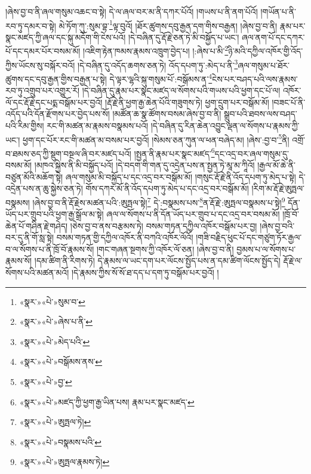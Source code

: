 །ཞེས་བྱ་བ་ནི་ཞལ་གསུམ་འཆང་བ་སྟེ། དེ་ལ་ཞལ་བར་མ་ནི་དཀར་པོའོ། །གཡས་པ་ནི་ནག་པོའོ། །གཡོན་པ་ནི་རབ་ཏུ་དམར་བ་སྟེ། མེ་ཏོག་ཀུ་:སུམ་བྷ་\footnote{«སྣར་»«པེ་»སུམ་བ་}ལྟ་བུའོ། །ཐོར་ཚུགས་དབུ་རྒྱན་དག་གིས་བརྒྱན། །ཞེས་བྱ་བ་ནི། རྣམ་པར་སྣང་མཛད་ཀྱི་ཞལ་དང་སྐུ་མདོག་གི་ངེས་པའོ། །དེ་བཞིན་དུ་རྡོ་རྗེ་ཅན་ཏེ་མི་བསྐྱོད་པ་ཡང་། ཞལ་ནག་པོ་དང་དཀར་པོ་དང་དམར་པོར་བསམ་མོ། །འཇིག་རྟེན་ཁམས་རྣམས་འཁྲུག་བྱེད་པ། །:ཞེས་པ་མི་\footnote{«སྣར་»«པེ་»ཞེས་པ་ནི་}ཉི་མའི་དཀྱིལ་འཁོར་གྱི་འོད་ཀྱིས་ཡོངས་སུ་བསྐོར་བའོ། །དེ་བཞིན་དུ་འདོད་ཆགས་ཅན་ཏེ། འོད་དཔག་ཏུ་:མེད་པ་ནི་\footnote{«སྣར་»«པེ་»མེད་པའི་}ཞལ་གསུམ་པ་ཐོར་ཚུགས་དང་དབུ་རྒྱན་གྱིས་བརྒྱན་པ་སྟེ། དེ་ལྟར་ལྷའི་སྐུ་གསུམ་པོ་:བསྒོམས་ན་\footnote{«སྣར་»«པེ་»བསྒོམས་ནས་}ངེས་པར་བཤད་པའི་ལས་རྣམས་རབ་ཏུ་འགྲུབ་པར་འགྱུར་རོ། །དེ་བཞིན་དུ་རྣམ་པར་སྣང་མཛད་ལ་སོགས་པའི་གཡས་པའི་ཕྱག་དང་པོ་ལ། འཁོར་ལོ་དང་རྡོ་རྗེ་དང་པདྨ་བསྒོམ་པར་བྱའོ། །རྡོ་རྗེ་ནི་ཕྱག་རྒྱ་ཆེན་པོའི་གཟུགས་ཏེ། ཕྱག་དྲུག་པར་བསྒོམ་མོ། །བཟང་པོ་ནི་འདོད་པའི་དོན་རྫོགས་པར་བྱེད་པས་སོ། །མཚོན་ཆ་སྣ་ཚོགས་བསམ་ཞེས་བྱ་བ་ནི། སྒྲུབ་པའི་ཐབས་ལས་བཤད་པའི་རིམ་གྱིས། རང་གི་མཚན་མ་རྣམས་བསྣམས་པའོ། །དེ་བཞིན་དུ་རིན་ཆེན་འབྱུང་ལྡན་ལ་སོགས་པ་རྣམས་ཀྱི་ཡང་། ཕྱག་དང་པོར་རང་གི་མཚན་མ་བསམ་པར་བྱའོ། །སེམས་ཅན་ཀུན་ལ་ཕན་བཞེད་མ། །ཞེས་:བྱ་བ་\footnote{«སྣར་»«པེ་»བྱ་}ནི། འགྲོ་བ་ཐམས་ཅད་ཀྱི་སྡུག་བསྔལ་ཞི་བར་མཛད་པའོ། །སྤྱན་ནི་རྣམ་པར་སྣང་མཛད་\footnote{«སྣར་»«པེ་»མཛད་ཀྱི་ཕྱག་རྒྱ་ཡིན་པས། རྣམ་པར་སྣང་མཛད་}དང་འདྲ་བར་ཞལ་གསུམ་དུ་བསམ་མོ། །མཁའ་སྐྱེས་ནི་མི་བསྐྱོད་པའོ། །དེ་བདག་གི་གན་དུ་འདྲེན་པས་ན་སྤྱན་ཏེ་མཱ་མ་ཀཱིའོ། །རྒྱལ་མོ་ཆེ་ནི་བཙུན་མོའི་མཆོག་སྟེ། ཞལ་གསུམ་མི་བསྐྱོད་པ་དང་འདྲ་བར་བསྒོམ་མོ། །གསུང་རྡོ་རྗེ་ནི་འོད་དཔག་ཏུ་མེད་པ་སྟེ། དེ་འདྲེན་པས་ན་ཆུ་སྐྱེས་ཅན་ཏེ། གོས་དཀར་མོ་ནི་འོད་དཔག་ཏུ་མེད་པ་དང་འདྲ་བར་བསྒོམ་མོ། །རིག་མ་རྡོ་རྗེ་ཨུཏྤལ་བསྣམས། །ཞེས་བྱ་བ་ནི་རྡོ་རྗེས་མཚན་པའི་:ཨུཏྤལ་སྟེ།\footnote{«སྣར་»«པེ་»ཨུཏྤལ་ཏེ།} དེ་:བསྣམས་པས་\footnote{«སྣར་»«པེ་»བསྣམས་པའི་}ན་རྡོ་རྗེ་:ཨུཏྤལ་བསྣམས་པ་སྟེ།\footnote{«སྣར་»«པེ་»ཨུཏྤལ་རྣམས་ཏེ།} དོན་ཡོད་པར་གྲུབ་པའི་ཕྱག་རྒྱ་སྒྲོལ་མ་སྟེ། ཞལ་ལ་སོགས་པ་ནི་དོན་ཡོད་པར་གྲུབ་པ་དང་འདྲ་བར་བསམ་མོ། །ཁྲོ་བོ་ཆེན་པོ་གཤིན་རྗེ་གཤེད། །ཅེས་བྱ་བ་ནས་བརྩམས་ཏེ། བསམ་གཏན་དཀྱིལ་འཁོར་བསྒོམ་པར་བྱ། །ཞེས་བྱ་བའི་བར་དུ་ནི་གོ་སླ་སྟེ། བསམ་གཏན་གྱི་དཀྱིལ་འཁོར་ནི་བཀའི་འཁོར་ལོའོ། །གཟི་བརྗིད་ཕུང་པོ་དང་གཙུག་ཏོར་རྒྱལ་བ་ལ་སོགས་པ་ནི་ཁྲོ་བོ་རྣམས་སོ། །གང་གཞན་སྔགས་ཀྱི་འཁོར་ལོ་ཅན། །ཞེས་བྱ་བ་ནི། བྱམས་པ་ལ་སོགས་པ་རྣམས་སོ། །དམ་ཚིག་ནི་རིགས་ཏེ། དེ་རྣམས་ལ་ཡང་དག་པར་ལོངས་སྤྱོད་པས་ན་དམ་ཚིག་ལོངས་སྤྱོད་དེ། རྡོ་རྗེ་ལ་སོགས་པའི་མཚན་མའོ། །དེ་རྣམས་ཀྱིས་སོ་སོ་ཐ་དད་པ་དག་ཏུ་བསྒོམ་པར་བྱའོ། །
